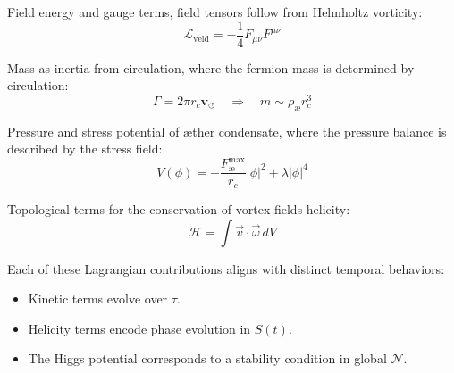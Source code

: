 Field energy and gauge terms, field tensors follow from Helmholtz vorticity:
\[
    \mathcal{L}_\text{veld} = -\frac{1}{4}F_{\mu\nu}F^{\mu\nu}
\]

Mass as inertia from circulation, where the fermion mass is determined by circulation:
\[
    \Gamma = 2\pi r_c \mathbf{v}_{\scriptscriptstyle\boldsymbol{\circlearrowleft}} \quad\Rightarrow\quad m \sim \rho_\text{\ae} r_c^3
\]

Pressure and stress potential of \ae{}ther condensate, where the pressure balance is described by the stress field:
\[
    V(\phi) = -\frac{F^{\text{max}}_{\text{\ae}}}{r_c}|\phi|^2 + \lambda|\phi|^4
\]

Topological terms for the conservation of vortex fields helicity:
\[
    \mathcal{H} = \int \vec{v}\cdot\vec{\omega}\, dV
\]

Each of these Lagrangian contributions aligns with distinct temporal behaviors:
\begin{itemize}
    \item Kinetic terms evolve over $\tau$.
    \item Helicity terms encode phase evolution in $S(t)$.
    \item The Higgs potential corresponds to a stability condition in global $\mathcal{N}$.
\end{itemize}

